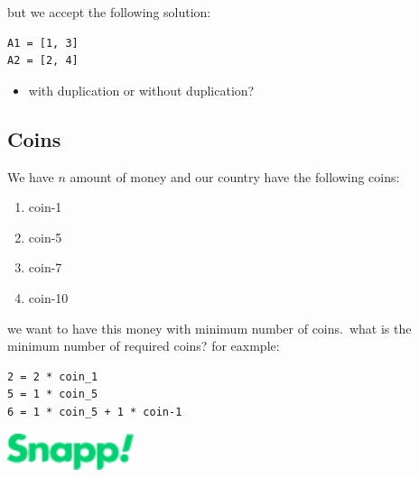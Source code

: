 \documentclass[]{article}
\begin{document}
but we accept the following solution:

\begin{verbatim}
A1 = [1, 3]
A2 = [2, 4]
\end{verbatim}

\begin{itemize}
  \item with duplication or without duplication?
\end{itemize}

\subsection{Coins}

We have $n$ amount of money and our country have the following coins:

\begin{enumerate}
  \item coin-1
  \item coin-5
  \item coin-7
  \item coin-10
\end{enumerate}

we want to have this money with minimum number of coins.\ what is the minimum number of required coins?
for eaxmple:

\begin{verbatim}
2 = 2 * coin_1
5 = 1 * coin_5
6 = 1 * coin_5 + 1 * coin-1
\end{verbatim}

\vspace{\fill}
\includegraphics[width=10em]{./snapp.png}
\end{document}
